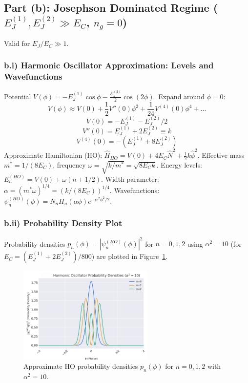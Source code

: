 \documentclass[12pt]{article}
\begin{document}
\begin{appendices}
\subsection[Part (b): Josephson Dominated Regime]{Part (b): Josephson Dominated Regime ($E_J^{(1)}, E_J^{(2)} \gg E_C$, $n_g=0$)}
\label{app:part_b}
Valid for $E_J/E_C \gg 1$. %

\subsubsection*{b.i) Harmonic Oscillator Approximation: Levels and Wavefunctions}
\label{app:part_b:subsubsec_i}
Potential $V(\phi) = -E_J^{(1)} \cos \phi - \frac{E_J^{(2)}}{2} \cos (2 \phi)$. Expand around $\phi=0$:
\[ V(\phi) \approx V(0) + \frac{1}{2}V''(0)\phi^2 + \frac{1}{24}V^{(4)}(0)\phi^4 + ... \]
\[ V(0) = -E_J^{(1)} - E_J^{(2)}/2 \]
\[ V''(0) = E_J^{(1)} + 2 E_J^{(2)} \equiv k \]
\[ V^{(4)}(0) = -(E_J^{(1)} + 8 E_J^{(2)}) \]
Approximate Hamiltonian (HO): $\hat{H}_{HO} = V(0) + 4 E_C \hat{N}^2 + \frac{1}{2} k \hat{\phi}^2$.
Effective mass $m^* = 1/(8E_C)$, frequency $\omega = \sqrt{k/m^*} = \sqrt{8 E_C k}$.
Energy levels: $E_n^{(HO)} = V(0) + \omega(n+1/2)$.
Width parameter: $\alpha = (m^* \omega)^{1/4} = (k / (8 E_C))^{1/4}$.
Wavefunctions: $\psi_n^{(HO)}(\phi) = N_n H_n(\alpha \phi) e^{-\alpha^2\phi^2/2}$.

\subsubsection*{b.ii) Probability Density Plot}
\label{app:part_b:subsubsec_ii}
Probability densities $p_n(\phi)=|\psi_n^{(HO)}(\phi)|^2$ for $n=0,1,2$ using $\alpha^2=10$ (for $E_C = (E_J^{(1)}+2E_J^{(2)})/800$) are plotted in Figure~\ref{fig:app_ho_probs}.

\begin{figure}[htbp] %
    \centering
    \includegraphics[width=0.6\textwidth]{fig_ho_prob.png} 
    \caption{Approximate HO probability densities $p_n(\phi)$ for $n=0,1,2$ with $\alpha^2=10$.}
    \label{fig:app_ho_probs} 
\end{figure}


\end{appendices}
\end{document}
